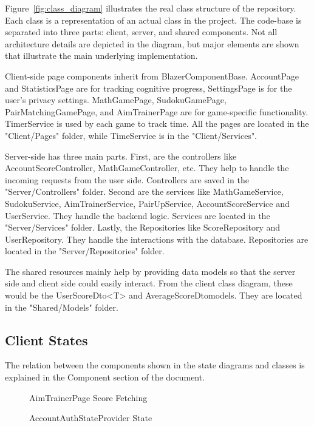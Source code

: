 \documentclass[11pt,a4paper]{article}
\newcommand{\inputdiagram}[1]{}
\newcommand{\textwidthdiagram}[2][1]{%
  \resizebox{#1\textwidth}{!}{\inputdiagram{#2}}%
}
\begin{document}
Figure~\ref{fig:class_diagram} illustrates the real class structure of the repository. Each class is a representation of an actual class in the project. The code-base is separated into three parts: client, server, and shared components. Not all architecture details are depicted in the diagram, but major elements are shown that illustrate the main underlying implementation. 


Client-side page components inherit from BlazerComponentBase. AccountPage and StatisticsPage are for tracking cognitive progress, SettingsPage is for the user's privacy settings. MathGamePage, SudokuGamePage, PairMatchingGamePage, and AimTrainerPage are for game-specific functionality. TimerService is used by each game to track time. All the pages are located in the "Client/Pages" folder, while TimeService is in the "Client/Services".


Server-side has three main parts. First, are the controllers like AccountScoreController, MathGameController, etc. They help to handle the incoming requests from the user side. Controllers are saved in the "Server/Controllers" folder. Second are the services like MathGameService, SudokuService, AimTrainerService, PairUpService, AccountScoreService and UserService. They handle the backend logic. Services are located in the "Server/Services" folder. Lastly, the Repositories like ScoreRepository and UserRepository. They handle the interactions with the database. Repositories are located in the "Server/Repositories" folder.


The shared resources mainly help by providing data models so that the server side and client side could easily interact. From the client class diagram, these would be the UserScoreDto<T> and AverageScoreDtomodels. They are located in the "Shared/Models" folder.

\subsection{Client States}

The relation between the components shown in the state diagrams and classes is explained in the Component section of the document.

\begin{figure}[H]
    \centering
    \begin{minipage}[b]{0.59\textwidth}
        \centering
        \textwidthdiagram{score_fetching_state.tex}
        \caption{AimTrainerPage Score Fetching}
        \label{fig:score_fetching_state}
    \end{minipage}
    \hfil
    \begin{minipage}[b]{0.4\textwidth}
        \centering
        \textwidthdiagram{user_authentication_state.tex}
        \caption{AccountAuthStateProvider State}
        \label{fig:user_authentication_state}
    \end{minipage}
\end{figure}
\end{document}
